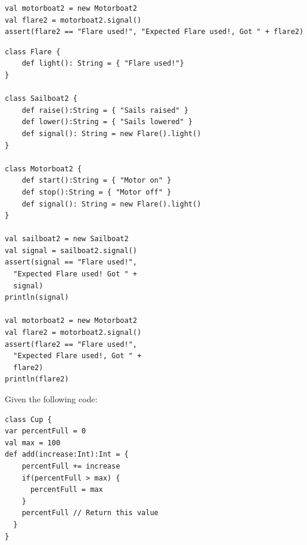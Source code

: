 \documentclass[12pt,a4paper]{exam}
\begin{document}
\begin{questions}
\begin{parts}
\begin{Verbatim}
val motorboat2 = new Motorboat2
val flare2 = motorboat2.signal() 
assert(flare2 == "Flare used!", "Expected Flare used!, Got " + flare2)
\end{Verbatim}

\begin{solution}
\begin{Verbatim}
class Flare {
	def light(): String = { "Flare used!"}
}

class Sailboat2 {
	def raise():String = { "Sails raised" }
	def lower():String = { "Sails lowered" }
	def signal(): String = new Flare().light()
}

class Motorboat2 {
	def start():String = { "Motor on" }
	def stop():String = { "Motor off" }
	def signal(): String = new Flare().light()
}

val sailboat2 = new Sailboat2
val signal = sailboat2.signal()
assert(signal == "Flare used!",
  "Expected Flare used! Got " +
  signal)
println(signal)

val motorboat2 = new Motorboat2
val flare2 = motorboat2.signal()
assert(flare2 == "Flare used!",
  "Expected Flare used!, Got " +
  flare2)
println(flare2)	
\end{Verbatim}	
\end{solution}

\end{parts}

\question

Given the following code:
\begin{Verbatim}
class Cup {
var percentFull = 0
val max = 100
def add(increase:Int):Int = {
    percentFull += increase
    if(percentFull > max) {
      percentFull = max
    }
    percentFull // Return this value
  }
}
\end{Verbatim}

\end{questions}
\end{document}
